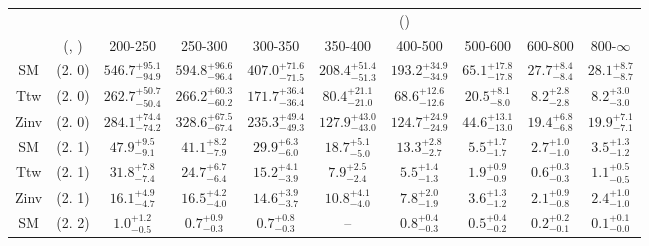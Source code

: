 \begin{table}[h!]
\tiny
\centering
{}
\begin{tabular}
{cccccccccc}
	\hline\hline
&	&	& \multicolumn{8}{c}{\scalht (\gev)}\\ 
	&	 (\njet, \nb) & 200-250 & 250-300 & 300-350 & 350-400 & 400-500 & 500-600 & 600-800 & 800-$\infty$ \\ [0.8ex] 
\hline
	SM & (2. 0) & $546.7^{+ 95.1 }_{- 94.9 }$ & $594.8^{+ 96.6 }_{- 96.4 }$ & $407.0^{+ 71.6 }_{- 71.5 }$ & $208.4^{+ 51.4 }_{- 51.3 }$ & $193.2^{+ 34.9 }_{- 34.9 }$ & $65.1^{+ 17.8 }_{- 17.8 }$ & $27.7^{+ 8.4 }_{- 8.4 }$ & $28.1^{+ 8.7 }_{- 8.7 }$ \\[0.5ex] 
	Ttw & (2. 0) & $262.7^{+ 50.7 }_{- 50.4 }$ & $266.2^{+ 60.3 }_{- 60.2 }$ & $171.7^{+ 36.4 }_{- 36.4 }$ & $80.4^{+ 21.1 }_{- 21.0 }$ & $68.6^{+ 12.6 }_{- 12.6 }$ & $20.5^{+ 8.1 }_{- 8.0 }$ & $8.2^{+ 2.8 }_{- 2.8 }$ & $8.2^{+ 3.0 }_{- 3.0 }$ \\[0.5ex] 
	Zinv & (2. 0) & $284.1^{+ 74.4 }_{- 74.2 }$ & $328.6^{+ 67.5 }_{- 67.4 }$ & $235.3^{+ 49.4 }_{- 49.3 }$ & $127.9^{+ 43.0 }_{- 43.0 }$ & $124.7^{+ 24.9 }_{- 24.9 }$ & $44.6^{+ 13.1 }_{- 13.0 }$ & $19.4^{+ 6.8 }_{- 6.8 }$ & $19.9^{+ 7.1 }_{- 7.1 }$ \\[0.5ex] 
	SM & (2. 1) & $47.9^{+ 9.5 }_{- 9.1 }$ & $41.1^{+ 8.2 }_{- 7.9 }$ & $29.9^{+ 6.3 }_{- 6.0 }$ & $18.7^{+ 5.1 }_{- 5.0 }$ & $13.3^{+ 2.8 }_{- 2.7 }$ & $5.5^{+ 1.7 }_{- 1.7 }$ & $2.7^{+ 1.0 }_{- 1.0 }$ & $3.5^{+ 1.3 }_{- 1.2 }$ \\[0.5ex] 
	Ttw & (2. 1) & $31.8^{+ 7.8 }_{- 7.4 }$ & $24.7^{+ 6.7 }_{- 6.4 }$ & $15.2^{+ 4.1 }_{- 3.9 }$ & $7.9^{+ 2.5 }_{- 2.4 }$ & $5.5^{+ 1.4 }_{- 1.3 }$ & $1.9^{+ 0.9 }_{- 0.9 }$ & $0.6^{+ 0.3 }_{- 0.3 }$ & $1.1^{+ 0.5 }_{- 0.5 }$ \\[0.5ex] 
	Zinv & (2. 1) & $16.1^{+ 4.9 }_{- 4.7 }$ & $16.5^{+ 4.2 }_{- 4.0 }$ & $14.6^{+ 3.9 }_{- 3.7 }$ & $10.8^{+ 4.1 }_{- 4.0 }$ & $7.8^{+ 2.0 }_{- 1.9 }$ & $3.6^{+ 1.3 }_{- 1.2 }$ & $2.1^{+ 0.9 }_{- 0.8 }$ & $2.4^{+ 1.0 }_{- 1.0 }$ \\[0.5ex] 
	SM & (2. 2) & $1.0^{+ 1.2 }_{- 0.5 }$ & $0.7^{+ 0.9 }_{- 0.3 }$ & $0.7^{+ 0.8 }_{- 0.3 }$ & -- & $0.8^{+ 0.4 }_{- 0.3 }$ & $0.5^{+ 0.4 }_{- 0.2 }$ & $0.2^{+ 0.2 }_{- 0.1 }$ & $0.1^{+ 0.1 }_{- 0.0 }$ \\[0.5ex] 

\end{tabular}
\end{table}
